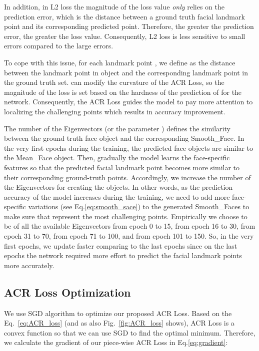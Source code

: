 \documentclass[a4paper,conference]{IEEEtran}
\begin{document}
In addition, in L2 loss the magnitude of the loss value \textit{only} relies on the prediction error, which is the distance between a ground truth facial landmark point and its corresponding predicted point. Therefore, the greater the prediction error, the greater the loss value. Consequently, L2 loss is less sensitive to small errors compared to the large errors.

To cope with this issue, for each landmark point , we define  as the distance between the landmark point  in  object and the corresponding landmark point  in the ground truth set.  can modify the curvature of the ACR Loss, so the magnitude of the loss is set based on the hardness of the prediction of  for the network. Consequently, the ACR Loss guides the model to pay more attention to localizing the challenging points which results in accuracy improvement.




The number of the Eigenvectors (or the parameter ) defines the similarity between the ground truth face object and the corresponding Smooth\_Face. In the very first epochs during the training, the predicted face objects are similar to the Mean\_Face object. Then, gradually the model learns the face-specific features so that the predicted facial landmark point becomes more similar to their corresponding ground-truth points. Accordingly, we increase the number of the Eigenvectors for creating the  objects. In other words, as the prediction accuracy of the model increases during the training, we need to add more face-specific variations (see Eq.\ref{eq:smooth_sace}) to the generated Smooth\_Faces to make sure that  represent the most challenging points. Empirically we choose  to be  of all the available Eigenvectors from epoch 0 to 15,  from epoch 16 to 30,  from epoch 31 to 70,  from epoch 71 to 100, and  from epoch 101 to 150. So, in the very first epochs, we update  faster comparing to the last epochs since on the last epochs the network required more effort to predict the facial landmark points more accurately.
\subsection{ACR Loss Optimization}
We use SGD algorithm to optimize our proposed ACR Loss. Based on the Eq.~\ref{eq:ACR_loss} (and as also Fig.~\ref{fig:ACR_loss} shows), ACR Loss is a convex function so that we can use SGD to find the optimal minimum. Therefore, we calculate the gradient of our piece-wise ACR Loss in Eq.\ref{eq:gradient}:
\end{document}
